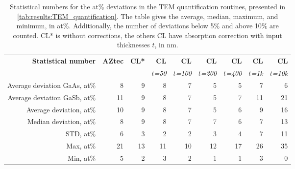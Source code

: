 \begin{table}[phtb]
    \begin{center}
        \caption{
            Statistical numbers for the at\% deviations in the TEM quantification routines, presented in \cref{tab:results:TEM_quantification}.
            The table gives the average, median, maximum, and minimum, in at\%. Additionally, the number of deviations below 5\% and above 10\% are counted.
            CL* is without corrections, the others CL have absorption correction with input thicknesses $t$, in nm.
        }
        \label{tab:results:TEM_quantification_stats}
        \begin{tabular}{rrrrrrrrr}
            \hline
            \textbf{Statistical number}  & \textbf{AZtec} & \textbf{CL*} & \textbf{CL}   & \textbf{CL}    & \textbf{CL}    & \textbf{CL}    & \textbf{CL}   & \textbf{CL}    \\
            \emph{}                      & \emph{}        & \emph{}      & \emph{$t$=50} & \emph{$t$=100} & \emph{$t$=200} & \emph{$t$=400} & \emph{$t$=1k} & \emph{$t$=10k} \\
            \hline
            Average deviation GaAs, at\% & 8              & 9            & 8             & 7              & 5              & 5              & 7             & 6              \\
            Average deviation GaSb, at\% & 11             & 9            & 8             & 7              & 5              & 7              & 11            & 21             \\
            Average deviation, at\%      & 10             & 9            & 8             & 7              & 5              & 6              & 9             & 16             \\
            Median deviation, at\%       & 8              & 9            & 8             & 7              & 7              & 6              & 7             & 13             \\
            STD, at\%                    & 6              & 3            & 2             & 2              & 3              & 4              & 7             & 11             \\
            Max, at\%                    & 21             & 13           & 11            & 10             & 12             & 17             & 26            & 35             \\
            Min, at\%                    & 5              & 2            & 3             & 2              & 1              & 1              & 3             & 0              \\

\end{tabular}
\end{center}
\end{table}
